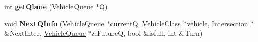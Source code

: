 \begin{DoxyCompactItemize}
\item 
\hypertarget{class_intersection_a409b2d3138b034f5b416476ea229165d}{int {\bfseries get\-Qlane} (\hyperlink{class_vehicle_queue}{Vehicle\-Queue} $\ast$Q)}\label{class_intersection_a409b2d3138b034f5b416476ea229165d}

\item 
\hypertarget{class_intersection_a1cc47dcabbfb512f9cb85ff9e7114e1a}{void {\bfseries Next\-Q\-Info} (\hyperlink{class_vehicle_queue}{Vehicle\-Queue} $\ast$current\-Q, \hyperlink{class_vehicle_class}{Vehicle\-Class} $\ast$vehicle, \hyperlink{class_intersection}{Intersection} $\ast$\&Next\-Inter, \hyperlink{class_vehicle_queue}{Vehicle\-Queue} $\ast$\&Future\-Q, bool \&isfull, int \&Turn)}\label{class_intersection_a1cc47dcabbfb512f9cb85ff9e7114e1a}

\end{DoxyCompactItemize}
